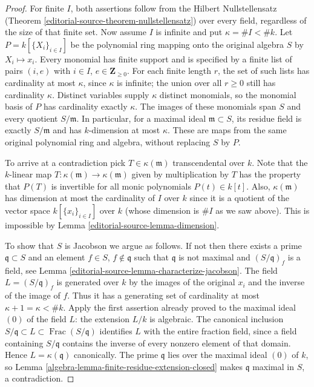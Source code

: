 \begin{proof}
For finite $I$, both assertions follow from the Hilbert
Nullstellensatz (Theorem \ref{editorial-source-theorem-nullstellensatz}) over every
field, regardless of the size of that finite set. Now assume $I$
is infinite and put $\kappa=\#I<\#k$.
Let $P=k[\{X_i\}_{i\in I}]$ be the polynomial ring mapping onto
the original algebra $S$ by $X_i\mapsto x_i$. Every monomial has
finite support and is specified by a finite list of pairs
$(i,e)$ with $i\in I$, $e\in\mathbf Z_{\geq0}$.
For each finite length $r$, the set of such lists has cardinality
at most $\kappa$, since $\kappa$ is infinite; the union over all
$r\geq0$ still has cardinality $\kappa$.
Distinct variables supply $\kappa$ distinct monomials, so the
monomial basis of $P$ has cardinality exactly $\kappa$.
The images of these monomials span $S$ and every quotient $S/\mathfrak m$.
In particular, for a maximal ideal $\mathfrak m\subset S$, its
residue field is exactly $S/\mathfrak m$ and has $k$-dimension
at most $\kappa$. These are maps from the same original polynomial
ring and algebra, without replacing $S$ by $P$.

\medskip\noindent
To arrive at a contradiction pick $T \in \kappa(\mathfrak m)$ transcendental
over $k$. Note that the $k$-linear map
$T : \kappa(\mathfrak m) \to \kappa(\mathfrak m)$
given by multiplication by $T$ has the property that $P(T)$ is invertible
for all monic polynomials $P(t) \in k[t]$.
Also, $\kappa(\mathfrak m)$ has dimension at most the cardinality of $I$
over $k$ since it is a quotient of the vector space
$k[\{x_i\}_{i \in I}]$ over $k$ (whose dimension is $\# I$ as we saw above).
This is impossible by Lemma \ref{editorial-source-lemma-dimension}.

\medskip\noindent
To show that $S$ is Jacobson we argue as follows. If not then
there exists a prime $\mathfrak q \subset S$ and an element $f \in S$,
$f \not \in \mathfrak q$ such that $\mathfrak q$ is not maximal
and $(S/\mathfrak q)_f$ is a field, see
Lemma \ref{editorial-source-lemma-characterize-jacobson}.
The field $L=(S/\mathfrak q)_f$ is generated over $k$ by the
images of the original $x_i$ and the inverse of the image of $f$.
Thus it has a generating set of cardinality at most
$\kappa+1=\kappa<\#k$. Apply the first assertion already proved
to the maximal ideal $(0)$ of the field $L$: the extension $L/k$
is algebraic. The canonical inclusion
$S/\mathfrak q\subset L\subset\operatorname{Frac}(S/\mathfrak q)$
identifies $L$ with the entire fraction field, since a field containing
$S/\mathfrak q$ contains the inverse of every nonzero element of
that domain. Hence $L=\kappa(\mathfrak q)$ canonically.
The prime $\mathfrak q$ lies over the maximal ideal $(0)$ of $k$,
so Lemma \ref{algebra-lemma-finite-residue-extension-closed} makes
$\mathfrak q$ maximal in $S$, a contradiction.
\end{proof}


